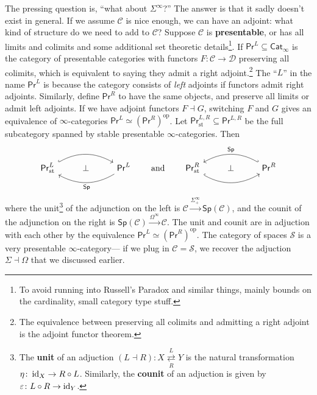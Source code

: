 The pressing question is, ``what about $\Sigma ^{\infty}$?'' The answer is that it sadly doesn't exist in general. If we assume $\mathcal{C} $ is nice enough, we can have an adjoint: what kind of structure do we need to add to $\mathcal{C} $? Suppose $\mathcal{C} $ is \textbf{presentable}, or has all limits and colimits and some additional set theoretic details\footnote{To avoid running into Russell's Paradox and similar things, mainly bounds on the cardinality, small category type stuff.}. If $\mathsf{Pr}^L \subseteq \mathsf{Cat} _{\infty}$ is the category of presentable categories with functors $F \colon \mathcal{C}  \to \mathcal{D} $ preserving all colimits, which is equivalent to saying they admit a right adjoint.\footnote{The equivalence between preserving all colimits and admitting a right adjoint is the adjoint functor theorem.} The ``$L$'' in the name $\mathsf{Pr} ^L$ is because the category consists of \emph{left} adjoints if functors admit right adjoints. Similarly, define $\mathsf{Pr} ^R$ to have the same objects, and preserve all limits or admit left adjoints. If we have adjoint functors $F \dashv G$, switching $F$ and $G$ gives an equivalence of $\infty$-categories $\mathsf{Pr}^L \simeq (\mathsf{Pr} ^R)^{ \mathrm{op}}$.
Let $\mathsf{Pr} ^{L,R}_{\mathrm{st}}\subseteq \mathsf{Pr} ^{L,R}$ be the full subcategory spanned by stable presentable $\infty$-categories. Then \[
\begin{tikzcd}
\mathsf{Pr}^L_{\mathrm{st}} \arrow[rr, hook, bend left] & \perp & \mathsf{Pr}^L \arrow[ll, "\mathsf{Sp}", bend left]
\end{tikzcd}\qquad \text{and} \qquad
\begin{tikzcd}
\mathsf{Pr}^R_{\mathrm{st}} \arrow[rr, hook, bend right] & \perp & \mathsf{Pr}^R \arrow[ll, "\mathsf{Sp}"', hook', bend right]
\end{tikzcd}
\]where the unit\footnote{The \textbf{unit} of an adjuction $(L \dashv R )\colon X\underset{R}{\overset{L}{\rightleftarrows }}  Y$ is the natural transformation $\eta \colon \operatorname{id}_X \to R \circ L$. Similarly, the \textbf{counit} of an adjuction is given by $\varepsilon \colon L \circ R \to \operatorname{id}_Y$.} of the adjunction on the left is $\mathcal{C} \overset{\Sigma_+^{\infty}}{\longrightarrow} \mathsf{Sp} (\mathcal{C} )$, and the counit of the adjunction on the right is $\mathsf{Sp} (\mathcal{C} ) \overset{\Omega ^{\infty}}{\longrightarrow} \mathcal{C} $. The unit and counit are in adjuction with each other by the equivalence $\mathsf{Pr}^L \simeq (\mathsf{Pr} ^R)^{ \mathrm{op}}$. The category of spaces $\mathcal{S} $ is a very presentable $\infty$-category--- if we plug in $\mathcal{C} =\mathcal{S} $, we recover the adjuction $\Sigma \dashv \Omega$ that we discussed earlier.


